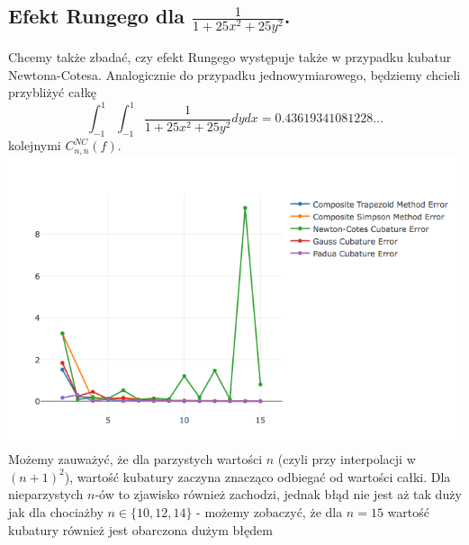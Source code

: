 \documentclass[10pt,wide]{mwart}
\theoremstyle{definition}
\begin{document}
\subsection{Efekt Rungego dla \(\frac{1}{1 + 25x^2 + 25y^2}\).}
Chcemy także zbadać, czy efekt Rungego występuje także w przypadku kubatur Newtona-Cotesa.
Analogicznie do przypadku jednowymiarowego, będziemy chcieli przybliżyć całkę
\begin{equation*}
  \int_{-1}^{1} \int_{-1}^{1}\frac{1}{1 + 25x^2 + 25y^2} dydx = 0.43619341081228\dots
  \end{equation*}
kolejnymi \(C_{n,n}^{NC}(f)\).\\
\includegraphics[scale=0.7]{runge.png}
Możemy zauważyć, że dla parzystych wartości \(n\) (czyli przy interpolacji w \((n+1)^2\)),
 wartość kubatury zaczyna znacząco odbiegać od wartości całki.
 Dla nieparzystych \(n\)-ów to zjawisko również zachodzi, jednak błąd nie jest aż tak duży jak dla chociażby \(n \in \{ 10, 12, 14\} \) - możemy zobaczyć, że dla \(n = 15\) wartość kubatury również jest obarczona dużym błędem
\end{document}
